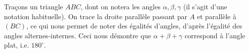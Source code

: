 \begin{preuve}
Traçons un triangle $ABC$, dont on notera les angles $\alpha,\beta,\gamma$ (il s'agit d'une notation habituelle).
\newline
On trace la droite parallèle passant par $A$ et parallèle à $(BC)$, ce qui nous permet de noter des égalités d'angles, d'après l'égalité des angles alternes-internes.
\newline
Ceci nous démontre que $\alpha+\beta+\gamma$ correspond à l'angle plat, i.e. $180^\circ$.
\end{preuve}

